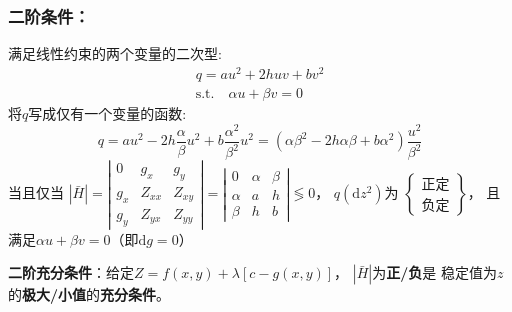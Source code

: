 \documentclass[12pt, a4paper, oneside]{article}
\begin{document}
\begin{CJK*}{UTF8}{gbsn}
\subsubsection{二阶条件：}
\noindent
满足线性约束的两个变量的二次型:
$$
\begin{array}{c}
	q=a u^{2}+2 h u v+b v^{2}
	\\
	\text{s.t.} \quad
	\alpha u+\beta v=0
\end{array}
$$
将$q$写成仅有一个变量的函数:
$$
q=a u^{2}-2 h \frac{\alpha}{\beta} u^{2}+b \frac{\alpha^{2}}{\beta^{2}} u^{2}=\left(\alpha \beta^{2}-2 h \alpha \beta+b \alpha^{2}\right) \frac{u^{2}}{\beta^{2}}
$$
当且仅当
$|\bar{H}| 
=
\left|\begin{array}{lll}0 & g_{x} & g_{y} \\ g_{x} & Z_{x x} & Z_{x y} \\ g_{y} & Z_{y x} & Z_{y y}\end{array}\right| 
=
\left|\begin{array}{lll}0 & \alpha & \beta \\ \alpha & a & h \\ \beta & h & b\end{array}\right|
\lessgtr 0
$，
$q(\mathrm{d}z^2)$为
$\left\{\begin{array}{l}\text{正定} \\ \text{负定}\end{array}\right\}$，
且满足$\alpha u+\beta v=0$（即$\mathrm{d}g=0$）

\noindent
\textbf{二阶充分条件}：给定$Z=f(x, y)+\lambda[c-g(x, y)]$，
$|\bar{H}|$为\textbf{正/负}是
稳定值为$z$的\textbf{极大/小值}的\textbf{充分条件}。


\end{CJK*}
\end{document}
